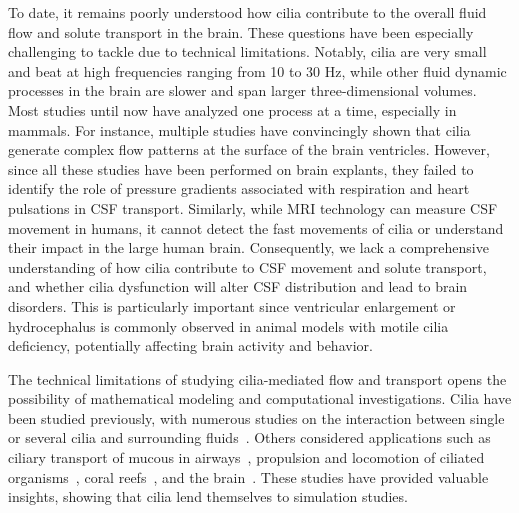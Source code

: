 \documentclass[fleqn]{wlscirep}
\begin{document}
To date, it remains poorly understood how cilia contribute to the overall fluid flow and solute transport in the brain.
These questions have been especially challenging to tackle due to technical limitations.
Notably, cilia are very small and beat at high frequencies ranging from 10 to 30 Hz, while other fluid dynamic processes in the brain are slower and span larger three-dimensional volumes.
Most studies until now have analyzed one process at a time, especially in mammals.
For instance, multiple studies have convincingly shown that cilia generate complex flow patterns at the surface of the brain ventricles.
However, since all these studies have been performed on brain explants, they failed to identify the role of pressure gradients associated with respiration and heart pulsations in CSF transport.
Similarly, while MRI technology can measure CSF movement in humans, it cannot detect the fast movements of cilia or understand their impact in the large human brain.
Consequently, we lack a comprehensive understanding of how cilia contribute to CSF movement and solute transport, and whether cilia dysfunction will alter CSF distribution and lead to brain disorders.
This is particularly important since ventricular enlargement or hydrocephalus is commonly observed in animal models with motile cilia deficiency, potentially affecting brain activity and behavior.

The technical limitations of studying cilia-mediated flow and transport opens the possibility of mathematical modeling and computational investigations. Cilia have been studied previously,
with numerous studies on the interaction between single or several cilia and surrounding fluids~\cite{Guo2020SimulatingGeometries, Ruvalcaba2021NumericalTree, Smith2009MathematicalFluids, Cui2019NumericalMethod, Cui2022AFlow}.
Others considered applications such as ciliary transport of mucous in airways~\cite{Fulford1986Muco-ciliaryLung, Ramirez-SanJuan2020Multi-scaleArrays},
propulsion and locomotion of ciliated organisms~\cite{BLAKE1974MechanicsMotion, Jahn1972LocomotionProtozoa, Brennen1977FluidFlagella},
coral reefs~\cite{Pacherres2022CiliaryProduction}, and the brain~\cite{Siyahhan2014FlowVentricles, Yoshida2022EffectVentricles, Salman2022ComputationalEmbryo, Thouvenin2020OriginCanal}.
These studies have provided valuable insights, showing that cilia lend themselves to simulation studies.
\end{document}
